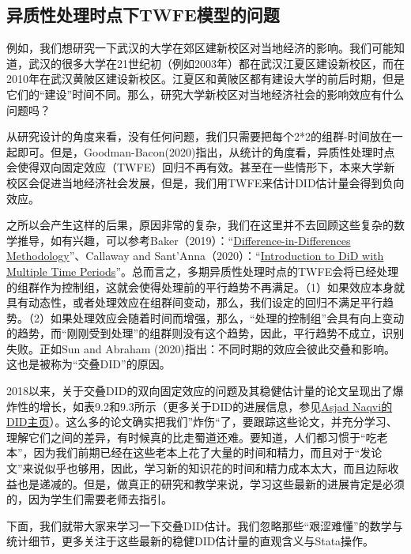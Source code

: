 \documentclass[cn,12pt,math=newtx,citestyle=gb7714-2015,bibstyle=gb7714-2015]{elegantbook}
\begin{document}
	\subsection{异质性处理时点下TWFE模型的问题}
	
	例如，我们想研究一下武汉的大学在郊区建新校区对当地经济的影响。我们可能知道，武汉的很多大学在21世纪初（例如2003年）都在武汉江夏区建设新校区，而在2010年在武汉黄陂区建设新校区。江夏区和黄陂区都有建设大学的前后时期，但是它们的“建设”时间不同。那么，研究大学新校区对当地经济社会的影响效应有什么问题吗？
	
	从研究设计的角度来看，没有任何问题，我们只需要把每个2*2的组群-时间放在一起即可。但是，Goodman-Bacon(2020)指出，从统计的角度看，异质性处理时点会使得双向固定效应（TWFE）回归不再有效。甚至在一些情形下，本来大学新校区会促进当地经济社会发展，但是，我们用TWFE来估计DID估计量会得到负向效应。
	
	之所以会产生这样的后果，原因非常的复杂，我们在这里并不去回顾这些复杂的数学推导，如有兴趣，可以参考Baker（2019）：“\href{https://andrewcbaker.netlify.app/2019/09/25/difference-in-differences-methodology/}{Difference-in-Differences Methodology}”、Callaway and Sant’Anna（2020）：“\href{https://cran.r-project.org/web/packages/did/vignettes/multi-period-did.html}{Introduction to DiD with Multiple Time Periods}”。总而言之，多期异质性处理时点的TWFE会将已经处理的组群作为控制组，这就会使得处理前的平行趋势不再满足。（1）如果效应本身就具有动态性，或者处理效应在组群间变动，那么，我们设定的回归不满足平行趋势。（2）如果处理效应会随着时间而增强，那么，“处理的控制组”会具有向上变动的趋势，而“刚刚受到处理”的组群则没有这个趋势，因此，平行趋势不成立，识别失败。正如Sun and Abraham (2020)指出：不同时期的效应会彼此交叠和影响。这也是被称为“交叠DID”的原因。
	
		2018以来，关于交叠DID的双向固定效应的问题及其稳健估计量的论文呈现出了爆炸性的增长，如表9.2和9.3所示（更多关于DID的进展信息，参见\href{https://asjadnaqvi.github.io/DiD/}{Asjad Naqvi的DID主页}）。这么多的论文确实把我们”炸伤“了，要跟踪这些论文，并充分学习、理解它们之间的差异，有时候真的比走蜀道还难。要知道，人们都习惯于“吃老本”，因为我们前期已经在这些老本上花了大量的时间和精力，而且对于“发论文”来说似乎也够用，因此，学习新的知识花的时间和精力成本太大，而且边际收益也是递减的。但是，做真正的研究和教学来说，学习这些最新的进展肯定是必须的，因为学生们需要老师去指引。
	
	下面，我们就带大家来学习一下交叠DID估计。我们忽略那些“艰涩难懂”的数学与统计细节，更多关注于这些最新的稳健DID估计量的直观含义与Stata操作。
	
\end{document}
